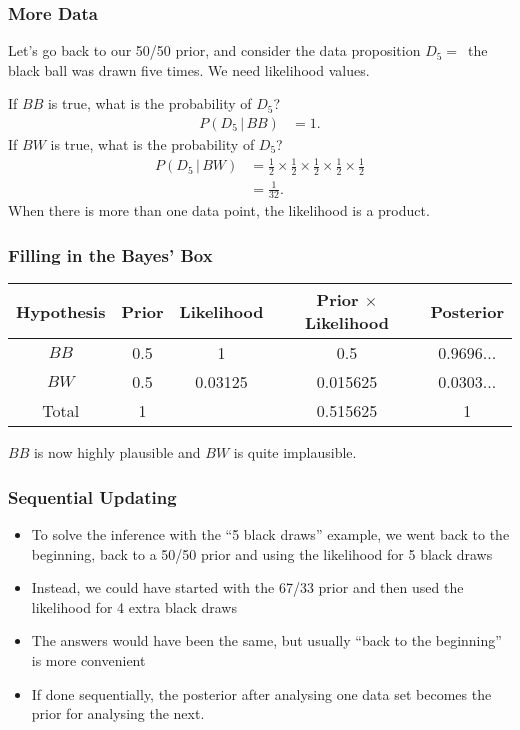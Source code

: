 \documentclass{beamer}
\newcommand{\given}{\,|\,}
\begin{document}
\begin{frame}
\frametitle{More Data}
Let's go back to our 50/50 prior, and consider the data
proposition $D_5 = $~the black ball was drawn five times.
We need likelihood values.\pause

If $BB$ is true, what is the probability of $D_5$?
\begin{align}
P(D_5 \given BB) &= 1.
\end{align}
\pause
If $BW$ is true, what is the probability of $D_5$?
\begin{align}
P(D_5 \given BW) &= \frac{1}{2}\times\frac{1}{2}\times\frac{1}{2}\times
                    \frac{1}{2}\times\frac{1}{2}\\
                 &= \frac{1}{32}.
\end{align}\pause
When there is more than one data point, the likelihood is a
product.

\end{frame}


\begin{frame}
\frametitle{Filling in the Bayes' Box}
\begin{tabular}{|c|c|c|c|c|}
\hline
Hypothesis & Prior & Likelihood & Prior $\times$ Likelihood & Posterior \\
\hline
$BB$ & 0.5 & 1 & 0.5 & 0.9696... \\
$BW$ & 0.5 & 0.03125 & 0.015625 & 0.0303... \\
\hline
Total & 1 & & 0.515625 & 1\\
\hline
\end{tabular}
\pause

$BB$ is now highly plausible and $BW$ is quite implausible.

\end{frame}



\begin{frame}
\frametitle{Sequential Updating}

\begin{itemize}
\item To solve the inference with the ``5 black draws'' example,
we went back to the beginning, back to a 50/50 prior and
using the likelihood for 5 black draws\pause
\item Instead, we could have started with the 67/33 prior and then used
the likelihood for 4 extra black draws\pause
\item  The answers would have been the same, but usually
``back to the beginning'' is more convenient\pause
\item If done sequentially, 
the posterior after analysing one data set becomes
the prior for analysing the next.
\end{itemize}


\end{frame}
\end{document}
